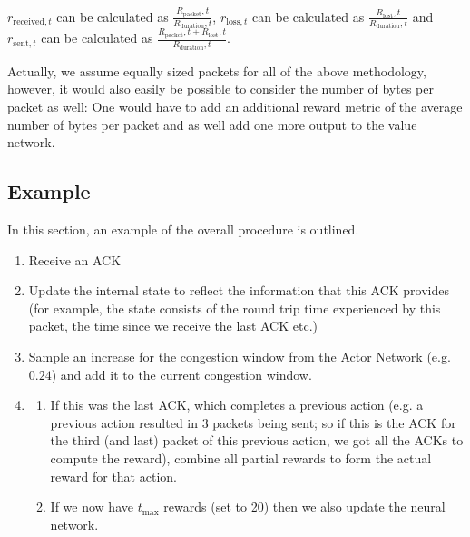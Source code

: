 \documentclass[sigconf]{acmart}
\begin{document}
$r_{\text{received},t}$ can be calculated as $\frac{R_\text{packet},t}{R_\text{duration},t}$, $r_{\text{loss},t}$ can be calculated as $\frac{R_\text{lost},t}{R_\text{duration},t}$ and $r_{\text{sent},t}$ can be calculated as $\frac{{R_\text{packet},t} + {R_\text{lost},t}}{R_\text{duration},t}$.

Actually, we assume equally sized packets for all of the above methodology, however, it would also easily be possible to consider the number of bytes per packet as well: One would have to add an additional reward metric of the average number of bytes per packet and as well add one more output to the value network. 

\subsection{Example}

In this section, an example of the overall procedure is outlined. 

\begin{enumerate}
\item Receive an ACK
\item Update the internal state to reflect the information that this ACK provides (for example, the state consists of the round trip time experienced by this packet, the time since we receive the last ACK etc.)
\item Sample an increase for the congestion window from the Actor Network (e.g. $0.24$) and add it to the current congestion window.
\item 
\begin{enumerate}
\item If this was the last ACK, which completes a previous action (e.g. a previous action resulted in $3$ packets being sent; so if this is the ACK for the third (and last) packet of this previous action, we got all the ACKs to compute the reward), combine all partial rewards to form the actual reward for that action. 
\item If we now have $t_\text{max}$ rewards (set to 20) then we also update the neural network. 
\end{enumerate}

\end{enumerate}
\end{document}
